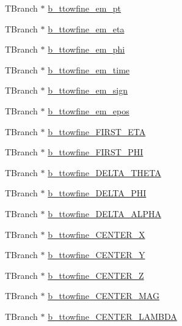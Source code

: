 \begin{DoxyCompactItemize}
\item 
T\+Branch $\ast$ \hyperlink{classXMLWriter_a062d37aadead23e6016667a5ea8eb8c3}{b\+\_\+ttowfine\+\_\+em\+\_\+pt}
\item 
T\+Branch $\ast$ \hyperlink{classXMLWriter_a65cb9fa3df5706da19c48d1687738502}{b\+\_\+ttowfine\+\_\+em\+\_\+eta}
\item 
T\+Branch $\ast$ \hyperlink{classXMLWriter_ae45b31c967db798c86ff47dcc209588a}{b\+\_\+ttowfine\+\_\+em\+\_\+phi}
\item 
T\+Branch $\ast$ \hyperlink{classXMLWriter_a5544482210f2820b6908c21813de480d}{b\+\_\+ttowfine\+\_\+em\+\_\+time}
\item 
T\+Branch $\ast$ \hyperlink{classXMLWriter_a6c1e4e7951bb03912fdbe964e11bd2b2}{b\+\_\+ttowfine\+\_\+em\+\_\+sign}
\item 
T\+Branch $\ast$ \hyperlink{classXMLWriter_a64225a9e263e03236df2b7025785ba10}{b\+\_\+ttowfine\+\_\+em\+\_\+epos}
\item 
T\+Branch $\ast$ \hyperlink{classXMLWriter_ae26498ac28a313f3c52d2c9585441545}{b\+\_\+ttowfine\+\_\+\+F\+I\+R\+S\+T\+\_\+\+E\+TA}
\item 
T\+Branch $\ast$ \hyperlink{classXMLWriter_a4a6cd2824bc01397e7e635fa63d49eef}{b\+\_\+ttowfine\+\_\+\+F\+I\+R\+S\+T\+\_\+\+P\+HI}
\item 
T\+Branch $\ast$ \hyperlink{classXMLWriter_a619175c0495a42b305215f9298db9c1f}{b\+\_\+ttowfine\+\_\+\+D\+E\+L\+T\+A\+\_\+\+T\+H\+E\+TA}
\item 
T\+Branch $\ast$ \hyperlink{classXMLWriter_a9dac6da6729adc131c68a2f377203407}{b\+\_\+ttowfine\+\_\+\+D\+E\+L\+T\+A\+\_\+\+P\+HI}
\item 
T\+Branch $\ast$ \hyperlink{classXMLWriter_ab18464c602ca0a51d29e2e47921357d7}{b\+\_\+ttowfine\+\_\+\+D\+E\+L\+T\+A\+\_\+\+A\+L\+P\+HA}
\item 
T\+Branch $\ast$ \hyperlink{classXMLWriter_af90212a6b59533c903ff87322bae24f2}{b\+\_\+ttowfine\+\_\+\+C\+E\+N\+T\+E\+R\+\_\+X}
\item 
T\+Branch $\ast$ \hyperlink{classXMLWriter_a3dc6af82953c13f2848e4c7256f20e9b}{b\+\_\+ttowfine\+\_\+\+C\+E\+N\+T\+E\+R\+\_\+Y}
\item 
T\+Branch $\ast$ \hyperlink{classXMLWriter_a3b1dbdfbfc79e78bdf2fc34be77fbf18}{b\+\_\+ttowfine\+\_\+\+C\+E\+N\+T\+E\+R\+\_\+Z}
\item 
T\+Branch $\ast$ \hyperlink{classXMLWriter_ad062c7c50fcae11e0a9a9ae0f4d0eb64}{b\+\_\+ttowfine\+\_\+\+C\+E\+N\+T\+E\+R\+\_\+\+M\+AG}
\item 
T\+Branch $\ast$ \hyperlink{classXMLWriter_a49761284e42e14c5db9b5fa069959eed}{b\+\_\+ttowfine\+\_\+\+C\+E\+N\+T\+E\+R\+\_\+\+L\+A\+M\+B\+DA}

\end{DoxyCompactItemize}
